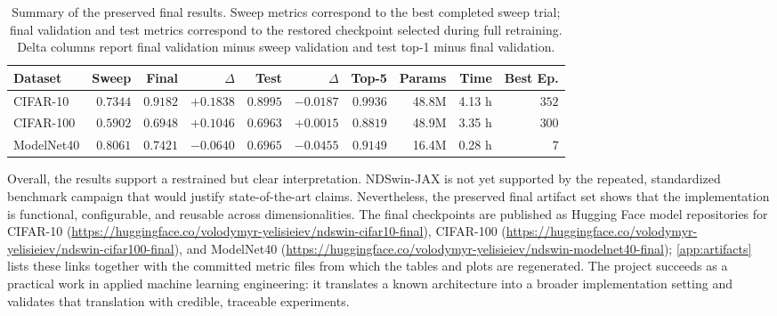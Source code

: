 \begin{table}[t]
  \centering
  \scriptsize
  \caption{Summary of the preserved final results. Sweep metrics correspond to the best completed sweep trial; final validation and test metrics correspond to the restored checkpoint selected during full retraining. Delta columns report final validation minus sweep validation and test top-1 minus final validation.}
  \label{tab:summary-results}
  \begin{tabular*}{\linewidth}{@{\extracolsep{\fill}}lrrrrrrrrr@{}}
    \toprule
    \textbf{Dataset} &
    {\textbf{Sweep}} &
    {\textbf{Final}} &
    {\textbf{\(\Delta\)}} &
    {\textbf{Test}} &
    {\textbf{\(\Delta\)}} &
    {\textbf{Top-5}} &
    {\textbf{Params}} &
    {\textbf{Time}} &
    {\textbf{Best Ep.}} \\
    \midrule
    CIFAR-10 & \(0.7344\) & \(0.9182\) & \(+0.1838\) & \(0.8995\) & \(-0.0187\) & \(0.9936\) & 48.8M & 4.13 h & \(352\) \\
    CIFAR-100 & \(0.5902\) & \(0.6948\) & \(+0.1046\) & \(0.6963\) & \(+0.0015\) & \(0.8819\) & 48.9M & 3.35 h & \(300\) \\
    ModelNet40 & \(0.8061\) & \(0.7421\) & \(-0.0640\) & \(0.6965\) & \(-0.0455\) & \(0.9149\) & 16.4M & 0.28 h & \(7\) \\
    \bottomrule
  \end{tabular*}
\end{table}

\clearpage

Overall, the results support a restrained but clear interpretation. NDSwin-JAX is not yet supported by the repeated, standardized benchmark campaign that would justify state-of-the-art claims. Nevertheless, the preserved final artifact set shows that the implementation is functional, configurable, and reusable across dimensionalities. The final checkpoints are published as Hugging Face model repositories for CIFAR-10 (\url{https://huggingface.co/volodymyr-yelisieiev/ndswin-cifar10-final}), CIFAR-100 (\url{https://huggingface.co/volodymyr-yelisieiev/ndswin-cifar100-final}), and ModelNet40 (\url{https://huggingface.co/volodymyr-yelisieiev/ndswin-modelnet40-final}); \autoref{app:artifacts} lists these links together with the committed metric files from which the tables and plots are regenerated. The project succeeds as a practical work in applied machine learning engineering: it translates a known architecture into a broader implementation setting and validates that translation with credible, traceable experiments.
